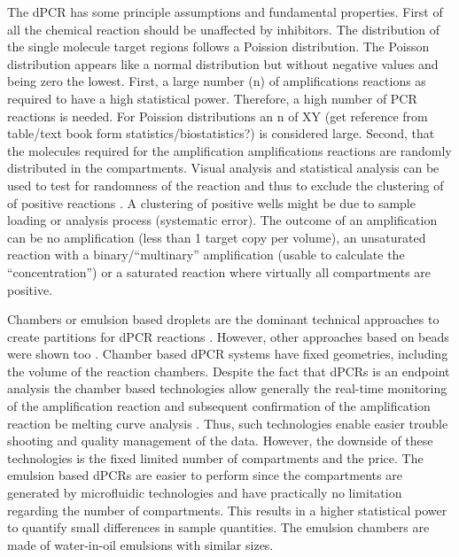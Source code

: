 \documentclass[a4,center,fleqn]{NAR}
\begin{document}
The dPCR has some principle assumptions and fundamental properties. First of all 
the chemical reaction should be unaffected by inhibitors. The distribution of 
the single molecule target regions follows a Poission distribution. The Poisson 
distribution appears like a normal distribution but without negative values and 
being zero the lowest. First, a large number (n) of amplifications reactions as 
required to have a high statistical power. Therefore, a high number of PCR 
reactions is needed. For Poission distributions an n of XY (get reference from 
table/text book form statistics/biostatistics?) is considered large. Second, that 
the molecules required for the amplification amplifications reactions are 
randomly distributed in the compartments. Visual analysis and statistical 
analysis can be used to test for randomness of the reaction and thus to exclude 
the clustering of of positive reactions \cite{Baddeley_Turner_2005, Baddeley_2015}. A 
clustering of positive wells might be due to sample loading or analysis process 
(systematic error). The outcome of an amplification can be no amplification 
(less than 1 target copy per volume), an unsaturated reaction with a 
binary/``multinary'' amplification (usable to calculate the ``concentration'') 
or a saturated reaction where virtually all compartments are positive.

Chambers or emulsion based droplets are the dominant technical approaches to 
create partitions for dPCR  reactions \cite{morley_digital_2014}. However, other 
approaches based on beads were shown too \cite{shuga_2013}. Chamber based dPCR 
systems have fixed geometries, including the volume of the reaction chambers. 
Despite the fact that dPCRs is an endpoint analysis the chamber based 
technologies allow generally the real-time monitoring of the amplification 
reaction and subsequent confirmation of the amplification reaction be melting 
curve analysis \cite{mojtahedi_2014}. Thus, such technologies enable easier 
trouble shooting and quality management of the data. However, the downside of 
these technologies is the fixed limited number of compartments and the price. 
The emulsion based dPCRs are easier to perform since the compartments are 
generated by microfluidic technologies and have practically no limitation 
regarding the number of compartments. This results in a higher statistical power 
to quantify small differences in sample quantities. The emulsion chambers are 
made of water-in-oil emulsions with similar sizes.
\end{document}
